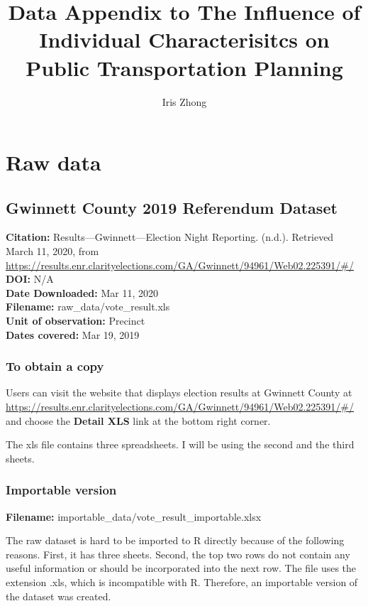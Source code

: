\documentclass[
]{article}
\title{Data Appendix to The Influence of Individual Characterisitcs on Public
Transportation Planning}
\author{Iris Zhong}
\date{}
\begin{document}
\maketitle

{
\setcounter{tocdepth}{2}
\tableofcontents
}
\hypertarget{raw-data}{%
\section{Raw data}\label{raw-data}}

\hypertarget{gwinnett-county-2019-referendum-dataset}{%
\subsection{Gwinnett County 2019 Referendum
Dataset}\label{gwinnett-county-2019-referendum-dataset}}

\textbf{Citation:} Results---Gwinnett---Election Night Reporting.
(n.d.). Retrieved March 11, 2020, from
\url{https://results.enr.clarityelections.com/GA/Gwinnett/94961/Web02.225391/\#/}\\
\textbf{DOI:} N/A\\
\textbf{Date Downloaded:} Mar 11, 2020\\
\textbf{Filename:} raw\_data/vote\_result.xls\\
\textbf{Unit of observation:} Precinct\\
\textbf{Dates covered:} Mar 19, 2019

\hypertarget{to-obtain-a-copy}{%
\subsubsection{To obtain a copy}\label{to-obtain-a-copy}}

Users can visit the website that displays election results at Gwinnett
County at
\url{https://results.enr.clarityelections.com/GA/Gwinnett/94961/Web02.225391/\#/}
and choose the \textbf{Detail XLS} link at the bottom right corner.

The xls file contains three spreadsheets. I will be using the second and
the third sheets.

\hypertarget{importable-version}{%
\subsubsection{Importable version}\label{importable-version}}

\textbf{Filename:} importable\_data/vote\_result\_importable.xlsx

The raw dataset is hard to be imported to R directly because of the
following reasons. First, it has three sheets. Second, the top two rows
do not contain any useful information or should be incorporated into the
next row. The file uses the extension .xls, which is incompatible with
R. Therefore, an importable version of the dataset was created.
\end{document}
